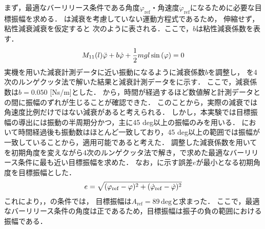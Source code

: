           まず，最適なバーリリース条件である角度$\varphi_{\mathrm{ref}}$・角速度$\dot{\varphi}_{\mathrm{ref}}$になるために必要な目標振幅を求める．
          は減衰を考慮していない運動方程式であるため，
          伸縮せず，粘性減衰減衰を仮定すると
          次のように表される．ここで，$b$は粘性減衰係数を表す．
          \begin{eqnarray}
            \equlabel{dampingEquation}
            M_{11}(l)\ddot{\varphi}+b\dot{\varphi}+\frac{1}{2}mgl\sin{(\varphi)}=0          
            \end{eqnarray}
          実機を用いた減衰計測データに近い振動になるように減衰係数$b$を調整し，
          を4次のルンゲクッタ法で解いた結果と減衰計測データをに示す．
          ここで，減衰係数は$b=0.050$ [Ns/m]とした．
          から，時間が経過するほど数値解と計測データとの間に振幅のずれが生じることが確認できた．
          このことから，実際の減衰では角速度比例だけではない減衰があると考えられる．
          しかし，本実験では目標振幅の導出には振動の半周期分かつ，主に45 deg以上の振幅のみを用いる．
          において時間経過後も振動数はほとんど一致しており，45 deg以上の範囲では振幅が一致していることから，適用可能であると考えた．
          調整した減衰係数を用いてを初期角度を変えながら4次のルンゲクッタ法で解き，で求めた最適なバーリリース条件に最も近い目標振幅を求めた．
          なお，に示す誤差$e$が最小となる初期角度を目標振幅とした．
          \begin{eqnarray}
            \equlabel{error}
            e=\sqrt{(\varphi_{\mathrm{ref}}-\varphi)^2+(\dot{\varphi}_{\mathrm{ref}}-\dot{\varphi})^2}
            \end{eqnarray}
          これにより，，の条件では，
          目標振幅は$A_{\mathrm{ref}}=89\,\mathrm{deg}$と求まった．
          ここで，最適なバーリリース条件の角度は正であるため，目標振幅は振子の負の範囲における振幅である．

